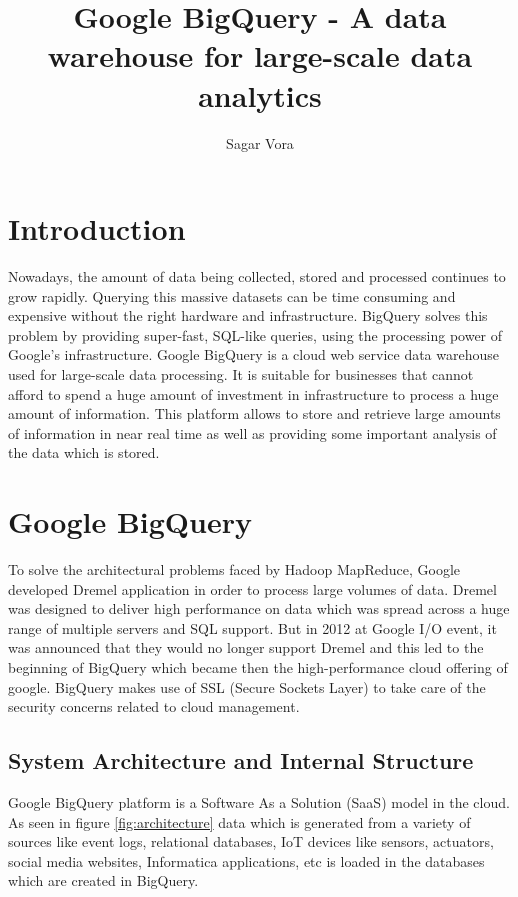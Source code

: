 \documentclass[9pt,twocolumn,twoside]{../../styles/osajnl}
\title{Google BigQuery - A data warehouse for large-scale data analytics}
\author[1]{Sagar Vora}
\affil[1]{School of Informatics and Computing, Bloomington, IN 47408, U.S.A.}
\begin{document}
\maketitle

\section{Introduction}
Nowadays, the amount of data being collected, stored and processed
continues to grow rapidly. Querying this massive datasets can be time
consuming and expensive without the right hardware and
infrastructure. BigQuery\cite{www-bigquery} solves this problem by
providing super-fast, SQL-like queries, using the processing power of
Google's infrastructure. Google BigQuery\cite{bigquery-paper} is a
cloud web service data warehouse used for large-scale data
processing. It is suitable for businesses that cannot afford to spend
a huge amount of investment in infrastructure to process a huge amount
of information. This platform allows to store and retrieve large
amounts of information in near real time as well as providing some
important analysis of the data which is stored.

\section{Google BigQuery}
To solve the architectural problems faced by
Hadoop\cite{www-apache-hadoop} MapReduce\cite{mapreduce-article},
Google developed Dremel\cite{dremel-paper} application in order to
process large volumes of data. Dremel was designed to deliver high
performance on data which was spread across a huge range of multiple
servers and SQL support. But in 2012 at Google I/O event, it was
announced that they would no longer support Dremel and this led to the
beginning of BigQuery which became then the high-performance cloud
offering of google. BigQuery makes use of SSL (Secure Sockets Layer) to take care of the security concerns related to cloud management.

\subsection{System Architecture and Internal Structure}

Google BigQuery platform is a Software As a Solution (SaaS) model in
the cloud. As seen in figure \ref{fig:architecture} data which is
generated from a variety of sources like event logs, relational
databases, IoT devices like sensors, actuators, social media websites,
Informatica\cite{www-informatica} applications, etc is loaded in the
databases which are created in BigQuery.
\end{document}
